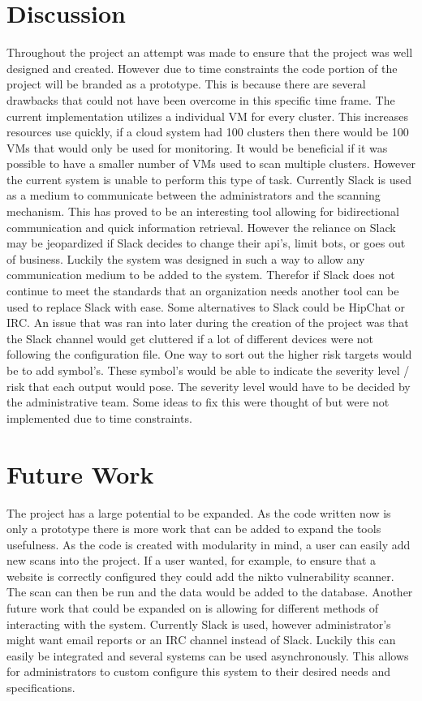 \documentclass[12pt]{article}
\begin{document}
\section{Discussion}
Throughout the project an attempt was made to ensure that the project was well designed and created. However due to time constraints the code portion of the project will be branded as a prototype. This is because there are several drawbacks that could not have been overcome in this specific time frame. The current implementation utilizes a individual VM for every cluster. This increases resources use quickly, if a cloud system had 100 clusters then there would be 100 VMs that would only be used for monitoring. It would be beneficial if it was possible to have a smaller number of VMs used to scan multiple clusters. However the current system is unable to perform this type of task. Currently Slack is used as a medium to communicate between the administrators and the scanning mechanism. This has proved to be an interesting tool allowing for bidirectional communication and quick information retrieval. However the reliance on Slack may be jeopardized if Slack decides to change their api's, limit bots, or goes out of business. Luckily the system was designed in such a way to allow any communication medium to be added to the system. Therefor if Slack does not continue to meet the standards that an organization needs another tool can be used to replace Slack with ease. Some alternatives to Slack could be HipChat or IRC.
An issue that was ran into later during the creation of the project was that the Slack channel would get cluttered if a lot of different devices were not following the configuration file. One way to sort out the higher risk targets would be to add symbol's. These symbol's would be able to indicate the severity level / risk that each output would pose. The severity level would have to be decided by the administrative team. Some ideas to fix this were thought of but were not implemented due to time constraints.

\section{Future Work}
The project has a large potential to be expanded. As the code written now is only a prototype there is more work that can be added to expand the tools usefulness. As the code is created with modularity in mind, a user can easily add new scans into the project. If a user wanted, for example, to ensure that a website is correctly configured they could add the nikto \cite{NiktoScan} vulnerability scanner. The scan can then be run and the data would be added to the database. Another future work that could be expanded on is allowing for different methods of interacting with the system. Currently Slack is used, however administrator's might want email reports or an IRC channel instead of Slack. Luckily this can easily be integrated and several systems can be used asynchronously. This allows for administrators to custom configure this system to their desired needs and specifications.
\end{document}
